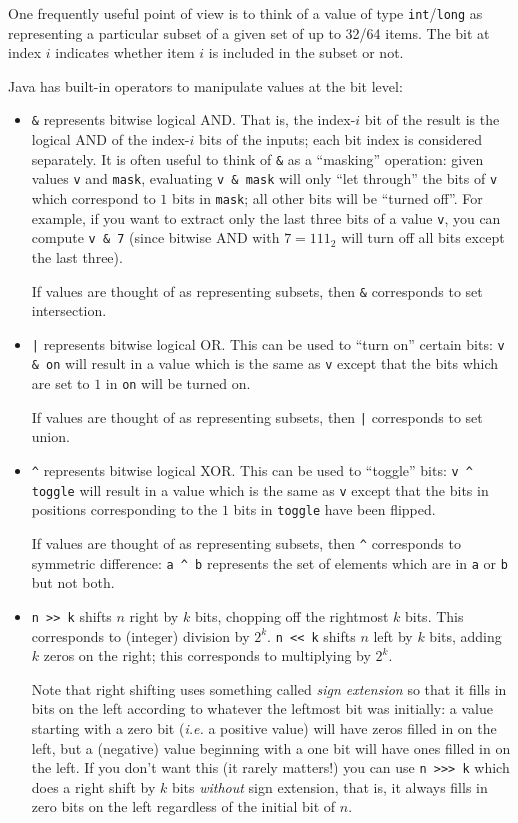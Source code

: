 \documentclass[10pt]{book}
\begin{document}
One frequently useful point of view is to think of a value of type
\texttt{int}/\texttt{long} as representing a particular subset of a
given set of up to 32/64 items.  The bit at index $i$ indicates
whether item $i$ is included in the subset or not.

Java has built-in operators to manipulate values at the bit level:
\begin{itemize}
\item \texttt{\&} represents bitwise logical AND.  That is, the
  index-$i$ bit of the result is the logical AND of the index-$i$ bits
  of the inputs; each bit index is considered separately.  It is often
  useful to think of \texttt{\&} as a ``masking'' operation: given
  values \texttt{v} and \texttt{mask}, evaluating \texttt{v \& mask}
  will only ``let through'' the bits of \texttt{v} which correspond to
  $1$ bits in \texttt{mask}; all other bits will be ``turned off''.
  For example, if you want to extract only the last three bits of a
  value \texttt{v}, you can compute \texttt{v \& 7} (since bitwise AND
  with $7 = 111_2$ will turn off all bits except the last three).

  If values are thought of as representing subsets, then \texttt{\&}
  corresponds to set intersection.
\item \texttt{|} represents bitwise logical OR.  This can be used to
  ``turn on'' certain bits: \texttt{v \& on} will result in a value
  which is the same as \texttt{v} except that the bits which are set
  to $1$ in \texttt{on} will be turned on.

  If values are thought of as representing subsets, then \texttt{|}
  corresponds to set union.
\item \verb|^| represents bitwise logical XOR.  This can be used to
  ``toggle'' bits: \verb|v ^ toggle| will result in a value which is
  the same as \texttt{v} except that the bits in positions
  corresponding to the $1$ bits in \texttt{toggle} have been flipped.

  If values are thought of as representing subsets, then \verb|^|
  corresponds to symmetric difference: \verb|a ^ b| represents the set
  of elements which are in \verb|a| or \verb|b| but not both.
\item \verb|n >> k| shifts $n$ right by $k$ bits, chopping off the
  rightmost $k$ bits.  This corresponds to (integer) division by
  $2^k$.  \verb|n << k| shifts $n$ left by $k$ bits, adding $k$ zeros
  on the right; this corresponds to multiplying by $2^k$.

  Note that right shifting uses something called \emph{sign extension}
  so that it fills in bits on the left according to whatever the
  leftmost bit was initially: a value starting with a zero bit
  (\emph{i.e.} a positive value) will have zeros filled in on the
  left, but a (negative) value beginning with a one bit will have ones
  filled in on the left.  If you don't want this (it rarely matters!)
  you can use \verb|n >>> k| which does a right shift by $k$ bits
  \emph{without} sign extension, that is, it always fills in zero bits
  on the left regardless of the initial bit of $n$.
\end{itemize}
\end{document}
